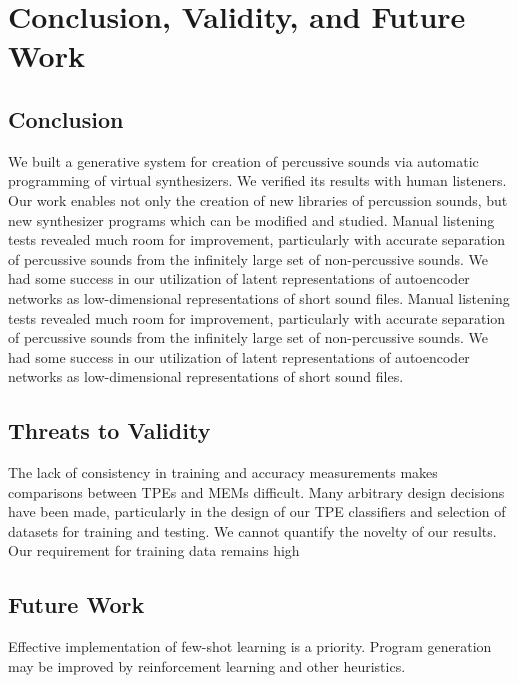 \documentclass[\main/thesis.tex]{subfiles}
\begin{document}
\chapter{Conclusion, Validity, and Future Work} 

\section{Conclusion}  We built a generative system for creation of percussive sounds via automatic programming of virtual synthesizers. We verified its results with human listeners.
Our work enables not only the creation of new libraries of percussion sounds, but new synthesizer programs which can be modified and studied. 
Manual listening tests revealed much room for improvement, particularly with accurate separation of percussive sounds from the infinitely large set of non-percussive sounds. We had some success in our utilization of latent representations of autoencoder networks as low-dimensional representations of short sound files.
Manual listening tests revealed much room for improvement, particularly with accurate separation of percussive sounds from the infinitely large set of non-percussive sounds. We had some success in our utilization of latent representations of autoencoder networks as low-dimensional representations of short sound files. \\ 
\section{Threats to Validity}  The lack of consistency in training and accuracy measurements makes comparisons between TPEs and MEMs difficult. Many arbitrary design decisions have been made, particularly in the design of our TPE classifiers and selection of datasets for training and testing. We cannot quantify the novelty of our results. Our requirement for training data remains high \\
\section{Future Work} Effective implementation of few-shot learning is a priority. Program generation may be improved by reinforcement learning and other heuristics.
\end{document}
